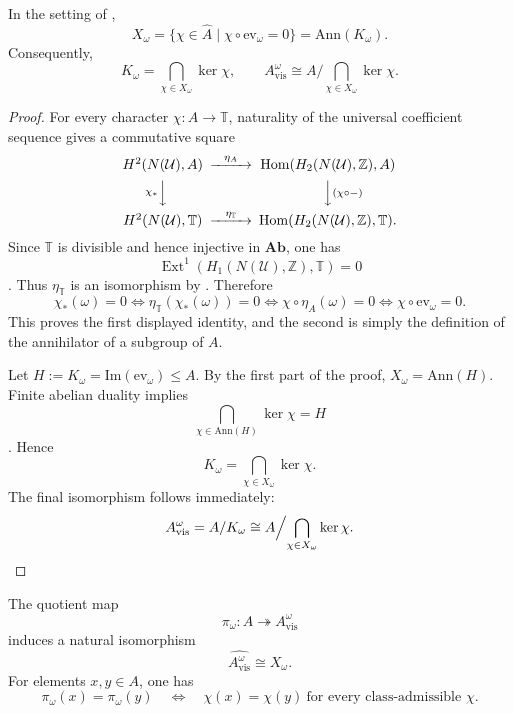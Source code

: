 \begin{proposition}\label{thm:intrinsic-visible-quotient}
In the setting of ,
\[
X_{\omega}
=
\{\chi\in\widehat A\mid \chi\circ \mathrm{ev}_{\omega}=0\}
=
\mathrm{Ann}(K_{\omega}).
\]
Consequently,
\[
K_{\omega}
=
\bigcap_{\chi\in X_{\omega}}\ker\chi,
\qquad
A_{\mathrm{vis}}^{\omega}\cong A\Big/\!\bigcap_{\chi\in X_{\omega}}\ker\chi.
\]
\end{proposition}

\begin{proof}
For every character $\chi:A\to\mathbb T$, naturality of the universal coefficient sequence gives a commutative square
\[
\begin{CD}
H^2(N(\mathcal U),A) @>\eta_A>> \mathrm{Hom}(H_2(N(\mathcal U),\mathbb Z),A) \\
@V\chi_*VV @VV(\chi\circ -)V \\
H^2(N(\mathcal U),\mathbb T) @>\eta_{\mathbb T}>> \mathrm{Hom}(H_2(N(\mathcal U),\mathbb Z),\mathbb T).
\end{CD}
\]
Since $\mathbb T$ is divisible and hence injective in $\mathbf{Ab}$, one has
\[
\operatorname{Ext}^1(H_1(N(\mathcal U),\mathbb Z),\mathbb T)=0
\]
\cite[Sec.~2.3]{Weibel1994}. Thus $\eta_{\mathbb T}$ is an isomorphism by . Therefore
\[
\chi_*(\omega)=0
\Longleftrightarrow
\eta_{\mathbb T}(\chi_*(\omega))=0
\Longleftrightarrow
\chi\circ \eta_A(\omega)=0
\Longleftrightarrow
\chi\circ \mathrm{ev}_{\omega}=0.
\]
This proves the first displayed identity, and the second is simply the definition of the annihilator of a subgroup of $A$.

Let $H:=K_{\omega}=\mathrm{Im}(\mathrm{ev}_{\omega})\le A$. By the first part of the proof, $X_{\omega}=\mathrm{Ann}(H)$. Finite abelian duality implies
\[
\bigcap_{\chi\in \mathrm{Ann}(H)}\ker\chi=H
\]
\cite[Part~I, Chaps.~2, 12]{Terras1999}. Hence
\[
K_{\omega}
=
\bigcap_{\chi\in X_{\omega}}\ker\chi.
\]
The final isomorphism follows immediately:
\[
A_{\mathrm{vis}}^{\omega}
=
A/K_{\omega}
\cong
A\Big/\!\bigcap_{\chi\in X_{\omega}}\ker\chi.
\qedhere
\]
\end{proof}

\begin{corollary}\label{cor:intrinsic-character-detection}
The quotient map
\[
\pi_{\omega}:A\twoheadrightarrow A_{\mathrm{vis}}^{\omega}
\]
induces a natural isomorphism
\[
\widehat{A_{\mathrm{vis}}^{\omega}}\cong X_{\omega}.
\]
For elements $x,y\in A$, one has
\[
\pi_{\omega}(x)=\pi_{\omega}(y)
\quad\Longleftrightarrow\quad
\chi(x)=\chi(y)\ \text{for every class-admissible }\chi.
\]
\end{corollary}

